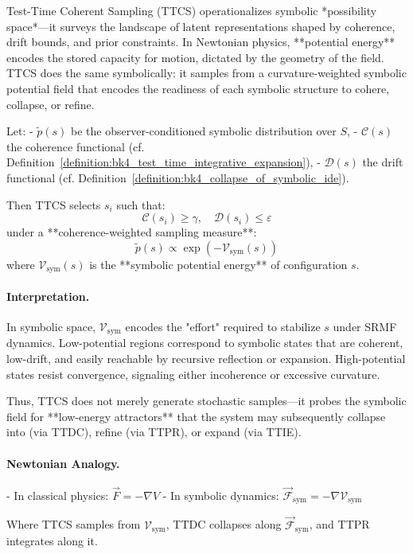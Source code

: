 \begin{scholium}
\label{scholium:bk4_ttcs_potential_field}
Test-Time Coherent Sampling (TTCS) operationalizes symbolic *possibility space*—it surveys the landscape of latent representations shaped by coherence, drift bounds, and prior constraints. In Newtonian physics, **potential energy** encodes the stored capacity for motion, dictated by the geometry of the field. TTCS does the same symbolically: it samples from a curvature-weighted symbolic potential field that encodes the readiness of each symbolic structure to cohere, collapse, or refine.

Let:
- $\tilde{p}(s)$ be the observer-conditioned symbolic distribution over $S$,
- $\mathcal{C}(s)$ the coherence functional (cf. Definition~\ref{definition:bk4_test_time_integrative_expansion}),
- $\mathcal{D}(s)$ the drift functional (cf. Definition~\ref{definition:bk4_collapse_of_symbolic_ide}).

Then TTCS selects $s_i$ such that:
\[
\mathcal{C}(s_i) \geq \gamma, \quad \mathcal{D}(s_i) \leq \varepsilon
\]
under a **coherence-weighted sampling measure**:
\[
\tilde{p}(s) \propto \exp\left( -\mathcal{V}_{\text{sym}}(s) \right)
\]
where $\mathcal{V}_{\text{sym}}(s)$ is the **symbolic potential energy** of configuration $s$.

\paragraph{Interpretation.} In symbolic space, $\mathcal{V}_{\text{sym}}$ encodes the "effort" required to stabilize $s$ under SRMF dynamics. Low-potential regions correspond to symbolic states that are coherent, low-drift, and easily reachable by recursive reflection or expansion. High-potential states resist convergence, signaling either incoherence or excessive curvature.

Thus, TTCS does not merely generate stochastic samples—it probes the symbolic field for **low-energy attractors** that the system may subsequently collapse into (via TTDC), refine (via TTPR), or expand (via TTIE).

\paragraph{Newtonian Analogy.}
- In classical physics: $\vec{F} = -\nabla V$
- In symbolic dynamics: $\vec{\mathcal{F}}_{\text{sym}} = -\nabla \mathcal{V}_{\text{sym}}$

Where TTCS samples from $\mathcal{V}_{\text{sym}}$, TTDC collapses along $\vec{\mathcal{F}}_{\text{sym}}$, and TTPR integrates along it.


\end{scholium}
